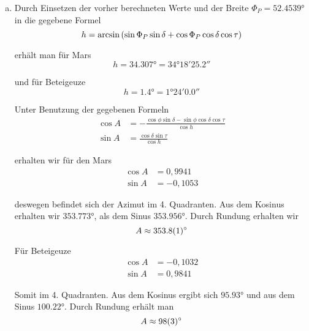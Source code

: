 \documentclass[a4paper,german,12pt,smallheadings]{scrartcl}
\newcommand*{\ra}[2][]{{
  \def\SIUnitSymbolDegree{\textsuperscript{h}}%
  \def\SIUnitSymbolArcminute{\textsuperscript{m}}%
  \def\SIUnitSymbolArcsecond{\textsuperscript{s}}%
  \ang[#1]{#2}}%
}
\begin{document}
\begin{enumerate}[a)]
    Somit ergibt sich für Mars
    \begin{equation}
      \tau = \ra{-0.3334} = \ra{23.6666} = \ra{23;40;0}
    \end{equation}

    Und für Beteigeuze
    \begin{equation}
      \tau = \ra{6.4936} = \ra{6;29;37}
    \end{equation}
  \item
    Durch Einsetzen der vorher berechneten Werte und der Breite $\Phi_P =
    \ang{52.4539}$ in die gegebene Formel
    \begin{equation}
      h = \arcsin \del{\sin \Phi_P \sin \delta + \cos \Phi_P \cos \delta \cos \tau}
    \end{equation}

    erhält man für Mars
    \begin{equation}
      h = \ang{34.307} = \ang{34;18;25.2}
    \end{equation}

    und für Beteigeuze
    \begin{equation}
      h = \ang{1.4} = \ang{1;24;0.0}
    \end{equation}

    Unter Benutzung der gegebenen Formeln
    \begin{align}
      \cos A &= -\frac{\cos \phi \sin \delta - \sin \phi \cos \delta \cos \tau}{\cos h} \\
      \sin A &= \frac{\cos \delta \sin \tau}{\cos h}
    \end{align}

    erhalten wir für den Mars
    \begin{align}
      \cos A &= 0{,}9941 \\
      \sin A &= -0{,}1053
    \end{align}

    deswegen befindet sich der Azimut im 4. Quadranten. Aus dem Kosinus
    erhalten wir $\ang{353.773}$, als dem Sinus $\ang{353.956}$. Durch Rundung
    erhalten wir
    \begin{equation}
      A \approx \ang{353.8+-0.1}
    \end{equation}

    Für Beteigeuze
    \begin{align}
      \cos A &= -0{,}1032 \\
      \sin A &= 0{,}9841
    \end{align}

    Somit im 4. Quadranten. Aus dem Kosinus ergibt sich $\ang{95.93}$ und aus
    dem Sinus $\ang{100.22}$. Durch Rundung erhält man
    \begin{equation}
      A \approx \ang{98+-3}
    \end{equation}


\end{enumerate}
\end{document}
